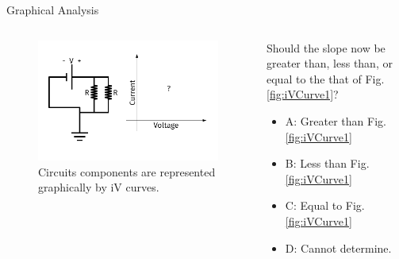 \documentclass{beamer}
\begin{document}
\begin{frame}{Graphical Analysis}
\begin{columns}[T]
\begin{column}{0.5\textwidth}
\begin{figure}
\centering
\includegraphics[width=\textwidth,trim=0.5cm 0cm 1cm 0cm,clip=true]{figures/iVCurve3.pdf}
\caption{\label{fig:iVCurve3} Circuits components are represented graphically by iV curves.}
\end{figure}
\end{column}
\begin{column}{0.5\textwidth}
\small
Should the slope now be greater than, less than, or equal to the that of Fig. \ref{fig:iVCurve1}?
\begin{itemize}
\item A: Greater than Fig. \ref{fig:iVCurve1}
\item B: Less than Fig. \ref{fig:iVCurve1}
\item C: Equal to Fig. \ref{fig:iVCurve1}
\item D: Cannot determine.
\end{itemize}
\end{column}
\end{columns}
\end{frame}
\end{document}
